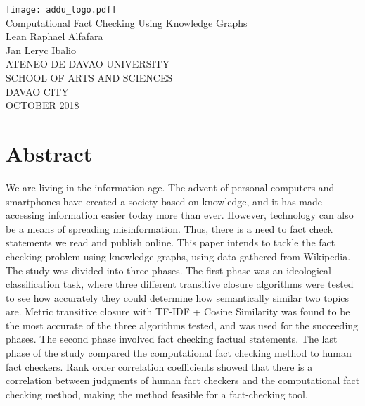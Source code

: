 \documentclass[10pt,11pt,12pt,oneside]{book}
\begin{document}
\cleardoublepage
\begin{titlepage}
    \begin{center}
        \texttt{[image: addu\_logo.pdf]}\\
        \vspace{1cm}
        \huge{Computational Fact Checking Using Knowledge Graphs}\\
        \vspace{1.5in}
        \large{Lean Raphael Alfafara\\Jan Leryc Ibalio}\\
        \vspace{1.5in}
        \large{ATENEO DE DAVAO UNIVERSITY\\SCHOOL OF ARTS AND SCIENCES\\DAVAO CITY}\\
        \vspace{1in}
        OCTOBER 2018
    \end{center}
\end{titlepage}

\frontmatter
\chapter*{Abstract}
We are living in the information age. The advent of personal computers and smartphones have created a society based on knowledge, and it has made accessing information easier today more than ever. However, technology can also be a means of spreading misinformation. Thus, there is a need to fact check statements we read and publish online. This paper intends to tackle the fact checking problem using knowledge graphs, using data gathered from Wikipedia. The study was divided into three phases. The first phase was an ideological classification task, where three different transitive closure algorithms were tested to see how accurately they could determine how semantically similar two topics are. Metric transitive closure with TF-IDF + Cosine Similarity was found to be the most accurate of the three algorithms tested, and was used for the succeeding phases. The second phase involved fact checking factual statements. The last phase of the study compared the computational fact checking method to human fact checkers. Rank order correlation coefficients showed that there is a correlation between judgments of human fact checkers and the computational fact checking method, making the method feasible for a fact-checking tool.\\
\end{document}
